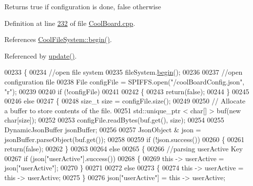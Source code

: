 \begin{DoxyReturn}{Returns}
true if configuration is done, false otherwise 
\end{DoxyReturn}


Definition at line \hyperlink{_cool_board_8cpp_source_l00232}{232} of file \hyperlink{_cool_board_8cpp_source}{Cool\+Board.\+cpp}.



References \hyperlink{_cool_file_system_8cpp_source_l00022}{Cool\+File\+System\+::begin()}.



Referenced by \hyperlink{_cool_board_8cpp_source_l00411}{update()}.


\begin{DoxyCode}
00233 \{
00234     \textcolor{comment}{//open file system}
00235     fileSystem.\hyperlink{class_cool_file_system_a6ba6f666ed4c530174f8569d2c636748}{begin}();
00236     
00237     \textcolor{comment}{//open configuration file}
00238     File configFile = SPIFFS.open(\textcolor{stringliteral}{"/coolBoardConfig.json"}, \textcolor{stringliteral}{"r"});
00239     
00240     \textcolor{keywordflow}{if} (!configFile)
00241 
00242     \{
00243         \textcolor{keywordflow}{return}(\textcolor{keyword}{false});
00244     \}
00245 
00246     \textcolor{keywordflow}{else}
00247     \{
00248         \textcolor{keywordtype}{size\_t} size = configFile.size();
00249 
00250         \textcolor{comment}{// Allocate a buffer to store contents of the file.}
00251         std::unique\_ptr < char[] > buf(\textcolor{keyword}{new} \textcolor{keywordtype}{char}[size]);
00252 
00253         configFile.readBytes(buf.get(), size);
00254 
00255         DynamicJsonBuffer jsonBuffer;
00256 
00257         JsonObject & json = jsonBuffer.parseObject(buf.get());
00258 
00259         \textcolor{keywordflow}{if} (!json.success())
00260         \{
00261             \textcolor{keywordflow}{return}(\textcolor{keyword}{false});
00262         \}
00263 
00264         \textcolor{keywordflow}{else}
00265         \{   
00266             \textcolor{comment}{//parsing userActive Key}
00267             \textcolor{keywordflow}{if} (json[\textcolor{stringliteral}{"userActive"}].success())
00268             \{
00269                 \textcolor{keyword}{this} -> userActive = json[\textcolor{stringliteral}{"userActive"}];
00270             \}
00271 
00272             \textcolor{keywordflow}{else}
00273             \{
00274                 \textcolor{keyword}{this} -> userActive = \textcolor{keyword}{this} -> userActive;
00275             \}
00276             json[\textcolor{stringliteral}{"userActive"}] = \textcolor{keyword}{this} -> userActive;

\end{DoxyCode}
